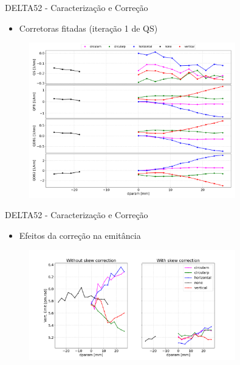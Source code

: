\documentclass{beamer}					  %
\begin{document}
\begin{frame}{DELTA52 - Caracterização e Correção}
    \begin{itemize}
    		\item Corretoras fitadas (iteração 1 de QS)
    \end{itemize}
    \begin{figure}[H]
        	\centering
            \includegraphics[width=0.8\textwidth]{2023-12-12/figures/knobs-after.png}
            \label{fig:bba}
    \end{figure} 
\end{frame}


\begin{frame}{DELTA52 - Caracterização e Correção}
    \begin{itemize}
    		\item Efeitos da correção na emitância
    \end{itemize}
    \begin{figure}[H]
        	\centering
            \includegraphics[width=0.8\textwidth]{2023-12-12/figures/Vertical_emmitance.png}
            \label{fig:bba}
    \end{figure} 
\end{frame}
\end{document}
